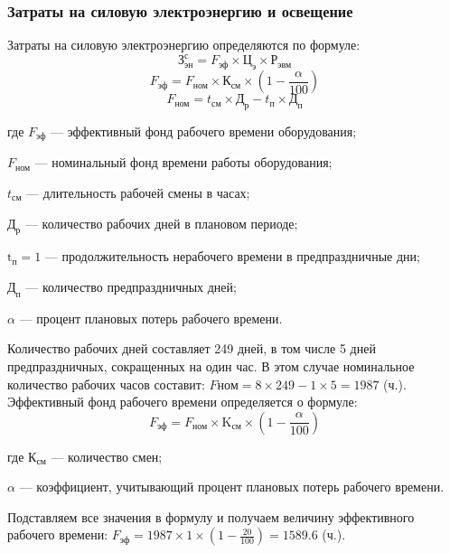 \subsubsection{Затраты на силовую электроэнергию и освещение}
Затраты на силовую электроэнергию определяются по формуле:
\begin{equation}\textrm{З}_\textrm{эн}^{с} = F_\textrm{эф} \times{} \textrm{Ц}_\textrm{э} \times{} \textrm{Р}_\textrm{эвм}\end{equation}
\begin{equation}F_\textrm{эф} = F_\textrm{ном} \times{} \textrm{К}_\textrm{см} \times{} (1 - \frac{\alpha}{100})\end{equation}
\begin{equation}F_\textrm{ном} = t_\textrm{см} \times{} \textrm{Д}_\textrm{р} - t_\textrm{п} \times{} \textrm{Д}_\textrm{п}\end{equation}

\begin{ESKDexplanation}
	\item[где ]{} $F_\textrm{эф}$ --- эффективный фонд рабочего времени оборудования;
	\item{} $F_\textrm{ном}$ --- номинальный  фонд времени работы оборудования;
	\item{} $t_\textrm{см}$ --- длительность рабочей смены в часах;
	\item{} $\textrm{Д}_\textrm{р}$ --- количество рабочих дней в плановом периоде;
	\item{} $\textrm{t}_\textrm{п} = 1$ --- продолжительность нерабочего времени в предпраздничные дни;
	\item{} $\textrm{Д}_\textrm{п}$ --- количество предпраздничных дней;
	\item{} $\alpha$ --- процент плановых потерь рабочего времени.
\end{ESKDexplanation}
Количество рабочих дней составляет 249 дней, в том числе 5 дней предпраздничных, сокращенных на один час.
В этом случае номинальное количество рабочих часов составит: $Fном =  8 \times{} 249 - 1 \times{} 5 = 1987$ (ч.).
Эффективный фонд  рабочего времени определяется о формуле:
\begin{equation}
	F_\textrm{эф} = F_\textrm{ном} \times{} \textrm{K}_\textrm{см} \times{} (1 - \frac{\alpha}{100})
\end{equation}
\begin{ESKDexplanation}
	\item[где ]{} $\textrm{К}_\textrm{см}$ --- количество смен;
	\item{} $\alpha$ --- коэффициент, учитывающий процент плановых потерь рабочего времени.
\end{ESKDexplanation}
Подставляем  все значения в формулу и получаем величину эффективного рабочего времени:
$F_\textrm{эф} = 1987 \times{} 1 \times{} (1 - \frac{20}{100}) = 1589.6$ (ч.).

